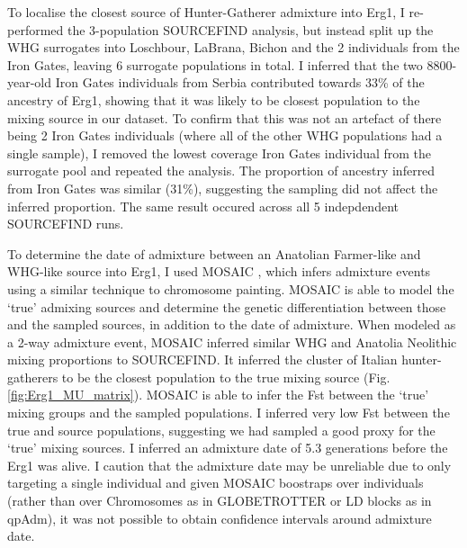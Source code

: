 To localise the closest source of Hunter-Gatherer admixture into Erg1, I re-performed the 3-population SOURCEFIND analysis, but instead split up the WHG surrogates into Loschbour, LaBrana, Bichon and the 2 individuals from the Iron Gates, leaving 6 surrogate populations in total. I inferred that the two 8800-year-old Iron Gates individuals from Serbia contributed towards 33\% of the ancestry of Erg1, showing that it was likely to be closest population to the mixing source in our dataset. To confirm that this was not an artefact of there being 2 Iron Gates individuals (where all of the other WHG populations had a single sample), I removed the lowest coverage Iron Gates individual from the surrogate pool and repeated the analysis. The proportion of ancestry inferred from Iron Gates was similar (31\%), suggesting the sampling did not affect the inferred proportion. The same result occured across all 5 indepdendent SOURCEFIND runs. 

To determine the date of admixture between an Anatolian Farmer-like and WHG-like source into Erg1, I used MOSAIC \cite{MOSAIC_2019}, which infers admixture events using a similar technique to chromosome painting. MOSAIC is able to model the `true' admixing sources and determine the genetic differentiation between those and the sampled sources, in addition to the date of admixture. When modeled as a 2-way admixture event, MOSAIC inferred similar WHG and Anatolia Neolithic mixing proportions to SOURCEFIND. It inferred the cluster of Italian hunter-gatherers to be the closest population to the true mixing source (Fig. \ref{fig:Erg1_MU_matrix}). MOSAIC is able to infer the Fst between the `true' mixing groups and the sampled populations. I inferred very low Fst between the true and source populations, suggesting we had sampled a good proxy for the `true’ mixing sources. I inferred an admixture date of 5.3 generations before the Erg1 was alive. I caution that the admixture date may be unreliable due to only targeting a single individual and given MOSAIC boostraps over individuals (rather than over Chromosomes as in GLOBETROTTER or LD blocks as in qpAdm), it was not possible to obtain confidence intervals around admixture date. 


